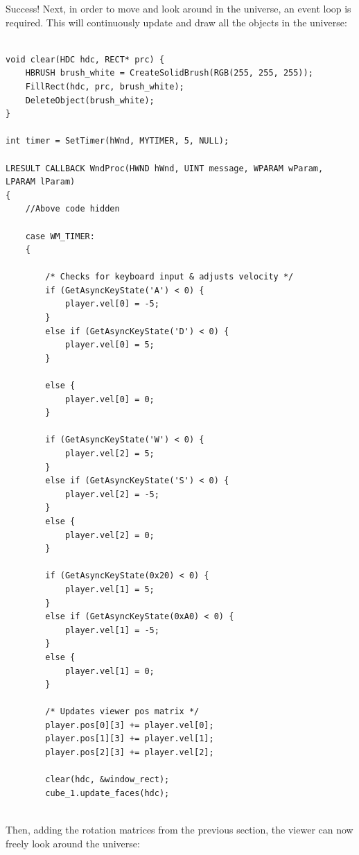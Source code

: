 \documentclass{article}
\begin{document}
Success! Next, in order to move and look around in the universe, an event loop is required. This will continuously update and draw all the objects in the universe:

\begin{lstlisting}

void clear(HDC hdc, RECT* prc) {
	HBRUSH brush_white = CreateSolidBrush(RGB(255, 255, 255));
	FillRect(hdc, prc, brush_white);
	DeleteObject(brush_white);
}

int timer = SetTimer(hWnd, MYTIMER, 5, NULL);

LRESULT CALLBACK WndProc(HWND hWnd, UINT message, WPARAM wParam, LPARAM lParam)
{
	//Above code hidden
	
	case WM_TIMER:
	{
	
		/* Checks for keyboard input & adjusts velocity */
		if (GetAsyncKeyState('A') < 0) {
			player.vel[0] = -5;
		}
		else if (GetAsyncKeyState('D') < 0) {
			player.vel[0] = 5;
		}
		
		else {
			player.vel[0] = 0;
		}

		if (GetAsyncKeyState('W') < 0) {
			player.vel[2] = 5;
		}
		else if (GetAsyncKeyState('S') < 0) {
			player.vel[2] = -5;
		}
		else {
			player.vel[2] = 0;
		}

		if (GetAsyncKeyState(0x20) < 0) {
			player.vel[1] = 5;
		}
		else if (GetAsyncKeyState(0xA0) < 0) {
			player.vel[1] = -5;
		}
		else {
			player.vel[1] = 0;
		}
		
		/* Updates viewer pos matrix */
		player.pos[0][3] += player.vel[0];
		player.pos[1][3] += player.vel[1];
		player.pos[2][3] += player.vel[2];
		
		clear(hdc, &window_rect);
		cube_1.update_faces(hdc);
		
\end{lstlisting}
Then, adding the rotation matrices from the previous section, the viewer can now freely look around the universe:
\end{document}

